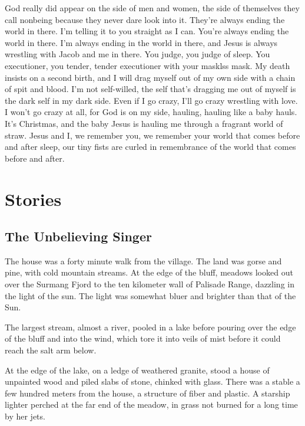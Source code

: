 \documentclass[english,11pt,letterpaper,onecolumn]{scrbook}
\begin{document}
\begin{poem}
\begin{stanza}
God really did appear on the side of men and women, the side of themselves they call nonbeing because they never dare look into it.
They're always ending the world in there.  I'm telling it to you straight as I can.  You're always ending the world in there.  I'm always ending in the world in there, and Jesus is always wrestling with Jacob and me in there.\verseline
You judge, you judge of sleep.  You executioner, you tender, tender executioner with your masklss mask.\verseline
My death insists on a second birth, and I will drag myself out of my own side with a chain of spit and blood.\verseline
I'm not self-willed, the self that's dragging me out of myself is the dark self in my dark side.\verseline
Even if I go crazy, I'll go crazy wrestling with love.\verseline
I won't go crazy at all, for God is on my side, hauling, hauling like a baby hauls.  It's Christmas, and the baby Jesus is hauling me through a fragrant world of straw.\verseline
Jesus and I, we remember you, we remember your world that comes before and after sleep, our tiny fists are curled in remembrance of the world that comes before and after.
\end{stanza}
\end{poem}

\part{Stories}
\chapter{The Unbelieving Singer}

	The house was a forty minute walk from the village. The land was gorse and pine, with cold mountain streams. At the edge of the bluff, meadows looked out over the Surmang Fjord to the ten kilometer wall of Palisade Range, dazzling in the light of the sun. The light was somewhat bluer and brighter than that of the Sun. 

	The largest stream, almost a river, pooled in a lake before pouring over the edge of the bluff and into the wind, which tore it into veils of mist before it could reach the salt arm below. 

	At the edge of the lake, on a ledge of weathered granite, stood a house of unpainted wood and piled slabs of stone, chinked with glass. There was a stable a few hundred meters from the house, a structure of fiber and plastic. A starship lighter perched at the far end of the meadow, in grass not burned for a long time by her jets.
\end{document}
